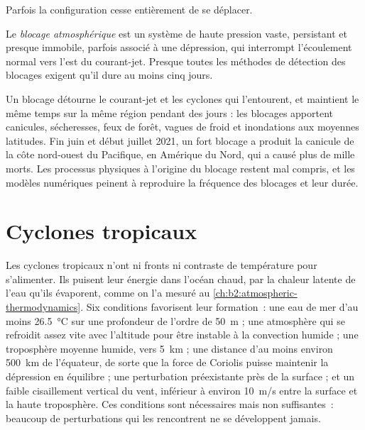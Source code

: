 Parfois la configuration cesse entièrement de se déplacer.

\begin{definition}\label{def:b2:weather-systems:blocking}
Le \emph{blocage atmosphérique} est un système de haute pression vaste, persistant et presque
immobile, parfois associé à une dépression, qui interrompt l'écoulement normal vers l'est
du courant-jet. Presque toutes les méthodes de détection des blocages exigent qu'il dure au moins cinq
jours.
\end{definition}

Un blocage détourne le courant-jet et les cyclones qui l'entourent, et maintient le même temps sur la même
région pendant des jours : les blocages apportent canicules, sécheresses, feux de forêt, vagues de froid et inondations
aux moyennes latitudes. Fin juin et début juillet 2021, un fort blocage a produit la canicule de la côte nord-ouest
du Pacifique, en Amérique du Nord, qui a causé plus de mille morts. Les processus physiques
à l'origine du blocage restent mal compris, et les modèles numériques peinent à reproduire
la fréquence des blocages et leur durée.

\section{Cyclones tropicaux}\label{sec:b2:weather-systems:tropical}

Les cyclones tropicaux n'ont ni fronts ni contraste de température pour s'alimenter. Ils puisent leur énergie dans
l'océan chaud, par la chaleur latente de l'eau qu'ils évaporent, comme on l'a mesuré au \cref{ch:b2:atmospheric-thermodynamics}.
Six conditions favorisent leur formation~: une eau de mer d'au moins \qty{26.5}{\celsius}
sur une profondeur de l'ordre de \qty{50}{m} ; une atmosphère qui se refroidit assez vite avec l'altitude pour être
instable à la convection humide ; une troposphère moyenne humide, vers \qty{5}{km} ; une distance d'au moins environ
\qty{500}{km} de l'équateur, de sorte que la force de Coriolis puisse maintenir la dépression en
équilibre ; une perturbation préexistante près de la surface ; et un faible cisaillement vertical du vent, inférieur à environ
\qty{10}{m/s} entre la surface et la haute troposphère. Ces conditions sont nécessaires mais non
suffisantes~: beaucoup de perturbations qui les rencontrent ne se développent jamais.


